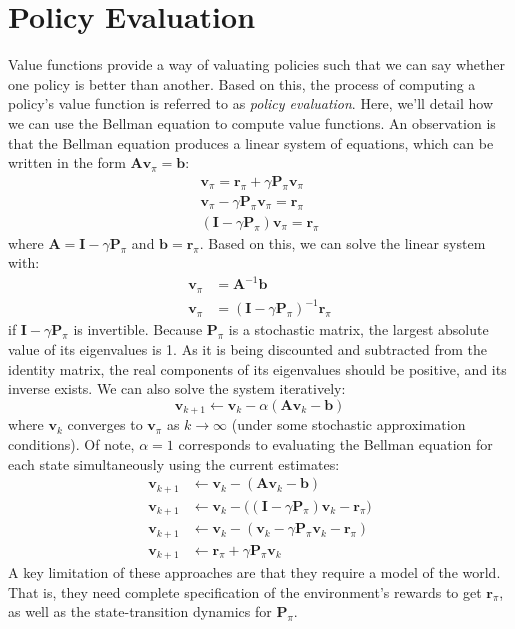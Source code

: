 \documentclass[twoside]{article}
\newcommand{\vpi}{\mathbf{v}_{\pi}}
\newcommand{\rpi}{\mathbf{r}_{\pi}}
\newcommand{\Ppi}{\mathbf{P}_{\pi}}
\begin{document}
\section{Policy Evaluation}
Value functions provide a way of valuating policies such that we can say whether one policy is better than another. Based on this, the process of computing a policy's value function is referred to as \textit{policy evaluation}. Here, we'll detail how we can use the Bellman equation to compute value functions.
An observation is that the Bellman equation produces a linear system of equations, which can be written in the form $\mathbf{A}\vpi = \mathbf{b}$:
\begin{align}
    \nonumber
    \vpi = \rpi + \gamma \Ppi \vpi \\
    \nonumber
    \vpi - \gamma \Ppi \vpi = \rpi \\
    \nonumber
    (\mathbf{I} - \gamma \Ppi) \vpi = \rpi
\end{align}
where $\mathbf{A} = \mathbf{I} - \gamma \Ppi$ and $\mathbf{b} = \rpi$. Based on this, we can solve the linear system with:
\begin{align}
    \nonumber
    \vpi &= \mathbf{A}^{-1}\mathbf{b} \\
    \vpi &= (\mathbf{I} - \gamma \Ppi)^{-1} \rpi
\end{align}
if $\mathbf{I} - \gamma \Ppi$ is invertible. Because $\Ppi$ is a stochastic matrix, the largest absolute value of its eigenvalues is 1. As it is being discounted and subtracted from the identity matrix, the real components of its eigenvalues should be positive, and its inverse exists. We can also solve the system iteratively:
\begin{equation}
    \mathbf{v}_{k+1} \leftarrow \mathbf{v}_{k} - \alpha (\mathbf{A} \mathbf{v}_{k} - \mathbf{b})
\end{equation}
where $\mathbf{v}_k$ converges to $\vpi$ as $k\rightarrow\infty$ (under some stochastic approximation conditions). Of note, $\alpha = 1$ corresponds to evaluating the Bellman equation for each state simultaneously using the current estimates:
\begin{align}
\nonumber
    \mathbf{v}_{k+1} &\leftarrow \mathbf{v}_{k} - (\mathbf{A} \mathbf{v}_{k} - \mathbf{b}) \\
    \nonumber
    \mathbf{v}_{k+1} &\leftarrow \mathbf{v}_{k} - \big((\mathbf{I} - \gamma \Ppi) \mathbf{v}_{k} - \rpi\big) \\
    \nonumber
    \mathbf{v}_{k+1} &\leftarrow \mathbf{v}_{k} - (\mathbf{v}_{k} - \gamma \Ppi \mathbf{v}_{k}  - \rpi) \\
    \nonumber
    \mathbf{v}_{k+1} &\leftarrow \rpi + \gamma \Ppi \mathbf{v}_{k}
\end{align}
A key limitation of these approaches are that they require a model of the world. That is, they need complete specification of the environment's rewards to get $\rpi$, as well as the state-transition dynamics for $\Ppi$.
\end{document}
